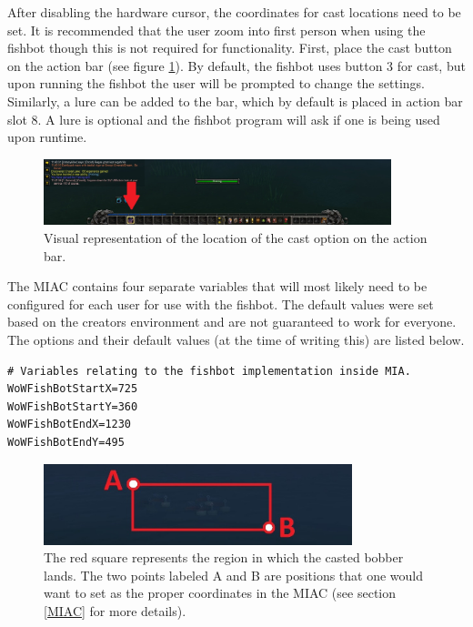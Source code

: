 After disabling the hardware cursor, the coordinates for cast locations need to be set. It is recommended that the user zoom into first person when using the fishbot though this is not required for functionality. First, place the cast button on the action bar (see figure \ref{cast bar}). By default, the fishbot uses button 3 for cast, but upon running the fishbot the user will be prompted to change the settings. Similarly, a lure can be added to the bar, which by default is placed in action bar slot 8. A lure is optional and the fishbot program will ask if one is being used upon runtime.

\begin{figure}[h]
	\centering
	\includegraphics[width=0.9\textwidth]{Images/WoWScrnShot_040118_234212.jpg}
	\caption{Visual representation of the location of the cast option on the action bar.} \label{cast bar}
\end{figure}

The MIAC contains four separate variables that will most likely need to be configured for each user for use with the fishbot. The default values were set based on the creators environment and are not guaranteed to work for everyone. The options and their default values (at the time of writing this) are listed below.

\begin{lstlisting}
# Variables relating to the fishbot implementation inside MIA.
WoWFishBotStartX=725
WoWFishBotStartY=360
WoWFishBotEndX=1230
WoWFishBotEndY=495
\end{lstlisting}

\begin{figure}[h]
	\centering
	\includegraphics[width=0.8\textwidth]{Images/WoWScrnShot_040118_234212b.jpg}
	\caption{The red square represents the region in which the casted bobber lands. The two points labeled A and B are positions that one would want to set as the proper coordinates in the MIAC (see section \ref{MIAC} for more details).} \label{fishbot square}
\end{figure}

